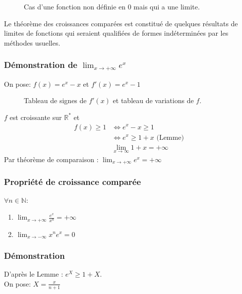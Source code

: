 \documentclass[9pt,twoside]{article}
\begin{document}
\begin{figure}[H]
	\centering
	\caption{Cas d'une fonction non définie en 0 mais qui a une limite.}
\end{figure}
Le théorème des croissances comparées est constitué de quelques résultats de limites de fonctions qui seraient qualifiées de formes indéterminées par les méthodes usuelles.

\subsubsection*{Démonstration de $\lim_{x\to+\infty}e^x$}
On pose: $f(x)=e^x-x$ et $f'(x)=e^x-1$
\begin{figure}[H]
\centering
{}
\caption{Tableau de signes de $f'(x)$ et tableau de variations de $f$.}
\end{figure}
$f$ est croissante sur $\mathbb{R}^{*}$ et \begin{align*}f(x) \geq 1 & \iff e^x-x\geq 1 \\
	& \iff e^x\geq 1+x \text{ (Lemme)}\\ 
& \lim_{x\to\infty}1+x=+\infty
\end{align*}
Par théorème de comparaison : $\lim_{x\to+\infty}e^x=+\infty$

\subsubsection*{Propriété de croissance comparée\\}
$\forall n \in \mathbb{N}$:
\begin{enumerate}
	\item $\lim_{x\to+\infty}\frac{e^x}{x^n}=+\infty$
	\item $\lim_{x\to-\infty}x^ne^x=0$
\end{enumerate}
\subsubsection*{Démonstration}
D'après le Lemme : $e^X\geq 1+ X$.\\
On pose: $X=\frac{x}{n+1}$
\end{document}
